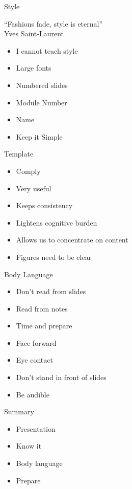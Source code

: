 \documentclass[pdf,table]{beamer}
\begin{document}
\begin{frame}{Style}
	\begin{block}
		``Fashions fade, style is eternal''\\
		Yves Saint-Laurent
	\end{block}
	\begin{itemize}
		\item I cannot teach style
		\item Large fonts
		\item Numbered slides
		\item Module Number
		\item Name
		\item Keep it Simple
	\end{itemize}
\end{frame}

\begin{frame}{Template}
	\begin{itemize}
		\item Comply 
		\item Very useful
		\item Keeps consistency
		\item Lightens cognitive burden
		\item Allows us to concentrate on content
		\item Figures need to be clear
	\end{itemize}
\end{frame}


\begin{frame}{Body Language}
	\begin{itemize}
		\item Don't read from slides
		\item Read from notes
		\item Time and prepare
		\item Face forward
		\item Eye contact
		\item Don't stand in front of slides
		\item Be audible
	\end{itemize}
\end{frame}

\begin{frame}{Summary}
	\begin{itemize}
		\item Presentation
		\item Know it 
		\item Body language
		\item Prepare
	\end{itemize}
\end{frame}
\end{document}
